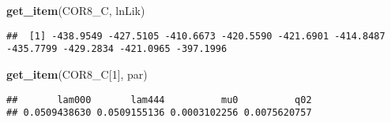 \documentclass[
]{article}
\newenvironment{Shaded}{\begin{snugshade}}{\end{snugshade}}
\newcommand{\DecValTok}[1]{\textcolor[rgb]{0.00,0.00,0.81}{#1}}
\newcommand{\FunctionTok}[1]{\textcolor[rgb]{0.13,0.29,0.53}{\textbf{#1}}}
\newcommand{\NormalTok}[1]{#1}
\newcommand{\SpecialCharTok}[1]{\textcolor[rgb]{0.81,0.36,0.00}{\textbf{#1}}}
\newcommand{\StringTok}[1]{\textcolor[rgb]{0.31,0.60,0.02}{#1}}
\begin{document}
\begin{Shaded}
\begin{Highlighting}[]
\FunctionTok{get\_item}\NormalTok{(COR8\_C, }\StringTok{\textquotesingle{}lnLik\textquotesingle{}}\NormalTok{)}
\end{Highlighting}
\end{Shaded}

\begin{verbatim}
##  [1] -438.9549 -427.5105 -410.6673 -420.5590 -421.6901 -414.8487 -435.7799 -429.2834 -421.0965 -397.1996
\end{verbatim}

\begin{Shaded}
\begin{Highlighting}[]
\FunctionTok{get\_item}\NormalTok{(COR8\_C[}\DecValTok{1}\NormalTok{], }\StringTok{\textquotesingle{}par\textquotesingle{}}\NormalTok{)}
\end{Highlighting}
\end{Shaded}

\begin{verbatim}
##       lam000       lam444          mu0          q02 
## 0.0509438630 0.0509155136 0.0003102256 0.0075620757
\end{verbatim}

\begin{Shaded}
\end{Shaded}
\end{document}
